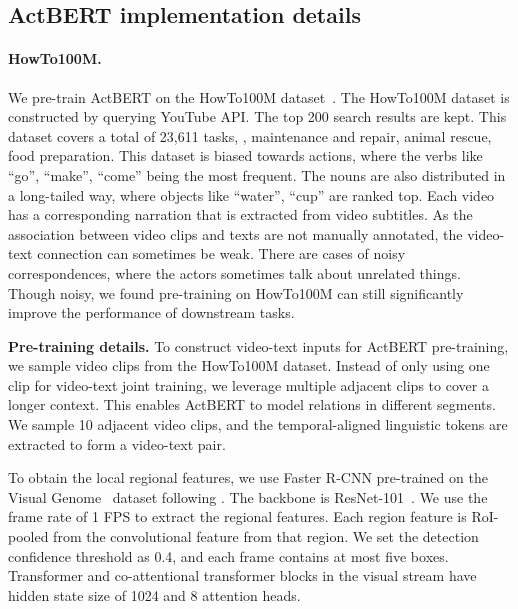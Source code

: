 \documentclass[10pt,twocolumn,letterpaper]{article}
\newcommand{\ours}{ActBERT\xspace}
\begin{document}
\subsection{\ours implementation details}
\paragraph{HowTo100M.} We pre-train \ours on the HowTo100M dataset~\cite{miech2019howto100m}.
The HowTo100M dataset is constructed by querying YouTube API. The top 200 search results are kept.
This dataset covers a total of 23,611 tasks, \eg, maintenance and repair, animal rescue, food preparation. This dataset is biased towards actions, where the verbs like ``go'', ``make'', ``come'' being the most frequent. The nouns are also distributed in a long-tailed way, where objects like ``water'', ``cup'' are ranked top.
Each video has a corresponding narration that is extracted from video subtitles.
As the association between video clips and texts are not manually annotated, the video-text connection can sometimes be weak. There are cases of noisy correspondences, where the actors sometimes talk about unrelated things. Though noisy, we found pre-training on HowTo100M can still significantly improve the performance of downstream tasks.

\noindent\textbf{Pre-training details.} 
To construct video-text inputs for \ours pre-training, we sample video clips from the HowTo100M dataset.
Instead of only using one clip for video-text joint training, we leverage multiple adjacent clips to cover a longer context. This enables \ours to model relations in different segments. We sample 10 adjacent video clips, and the temporal-aligned linguistic tokens are extracted to form a video-text pair. 

To obtain the local regional features, we use Faster R-CNN pre-trained on the Visual Genome~\cite{krishna2017visual} dataset following \cite{lu2019vilbert}. The backbone is ResNet-101~\cite{he2016deep}.
We use the frame rate of 1 FPS to extract the regional features.
Each region feature is RoI-pooled from the convolutional feature from that region.
We set the detection confidence threshold as 0.4, and each frame contains at most five boxes.
Transformer and co-attentional transformer blocks in the visual stream have hidden state size of 1024
and 8 attention heads.
\end{document}

